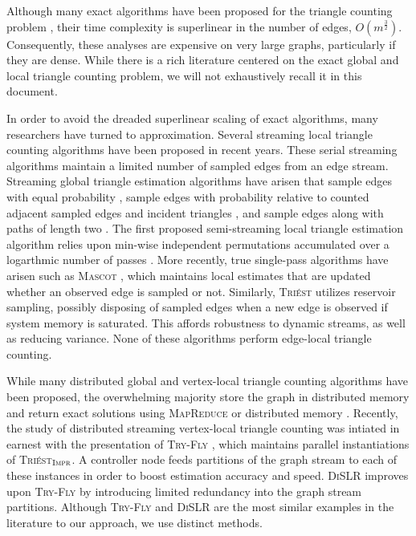 \documentclass[10]{report}
\newcommand{\algoname}[1]{\textnormal{\textsc{#1}}}
\begin{document}
Although many exact algorithms have been proposed for the triangle counting problem \cite{tsourakakis2008fast, becchetti2010efficient, chu2011triangle, suri2011counting, wolf2017fast}, their time complexity is superlinear in the number of edges, $O(m^{
\frac{3}{2}})$.
Consequently, these analyses are expensive on very large graphs, particularly if they are dense.
While there is a rich literature centered on the exact global and local triangle counting problem, we will not exhaustively recall it in this document.

In order to avoid the dreaded superlinear scaling of exact algorithms, many researchers have turned to approximation.
Several streaming local triangle counting algorithms have been proposed in recent years.
These serial streaming algorithms  maintain a limited number of sampled edges from an edge stream.
Streaming global triangle estimation algorithms have arisen that sample edges with equal probability \cite{tsourakakis2009doulion}, sample edges with probability relative to counted adjacent sampled edges and incident triangles \cite{ahmed2017sampling}, and sample edges along with paths of length two \cite{jha2013space}. 
The first proposed semi-streaming local triangle estimation algorithm relies upon min-wise independent permutations accumulated over a logarthmic number of passes \cite{becchetti2008efficient}. 
More recently, true single-pass algorithms have arisen such as \algoname{Mascot} \cite{lim2015mascot}, which maintains local estimates that are updated whether an observed edge is sampled or not.
Similarly, \algoname{Tri\'est} \cite{stefani2017triest} utilizes reservoir sampling, possibly disposing of sampled edges when a new edge is observed if system memory is saturated.
This affords robustness to dynamic streams, as well as reducing variance.
None of these algorithms perform edge-local triangle counting.

While many distributed global and vertex-local triangle counting algorithms have been proposed, the overwhelming majority store the graph in distributed memory and return exact solutions using \algoname{MapReduce} \cite{suri2011counting} or distributed memory \cite{arifuzzaman2013patric, pearce2017triangle}.
Recently, the study of distributed streaming vertex-local triangle counting was intiated in earnest with the presentation of \algoname{Try-Fly} \cite{shin2018tri}, which maintains parallel instantiations of \algoname{Tri\'est$_{\algoname{Impr}}$}.
A controller node feeds partitions of the graph stream to each of these instances in order to boost estimation accuracy and speed.
\algoname{DiSLR} \cite{shin2018dislr} improves upon \algoname{Try-Fly} by introducing limited redundancy into the graph stream partitions.
Although \algoname{Try-Fly} and \algoname{DiSLR} are the most similar examples in the literature to our approach, we use distinct methods.
\end{document}
